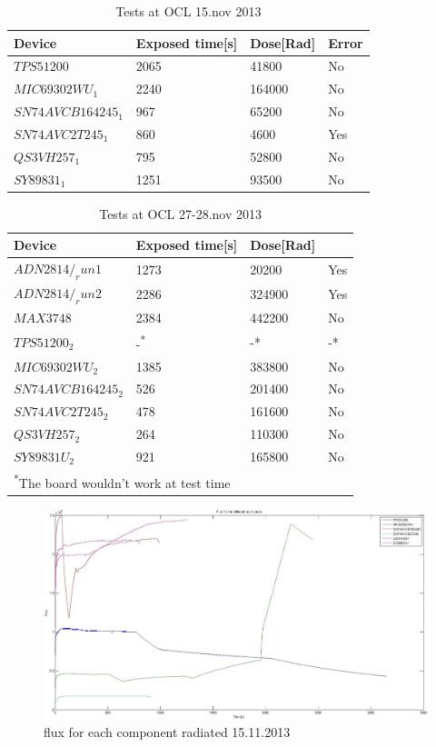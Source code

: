 \documentclass[12pt]{article}
\numberwithin{figure}{section}
\begin{document}
\begin{table}[!htbp]
 \centering
\begin{tabular}{|l|l|l|l|}\hline
Device & Exposed time[s] & Dose[Rad] & Error \\ \hline \hline
$TPS51200$ & 2065 & 41800 & No \\ \hline
$MIC69302WU_1$ & 2240 & 164000 & No \\ \hline
$SN74AVCB164245_1$ & 967  & 65200 & No \\ \hline
$SN74AVC2T245_1$ & 860  & 4600 & Yes \\ \hline
$QS3VH257_1$ & 795  & 52800 & No \\ \hline
$SY89831_1$ & 1251 & 93500 & No \\ \hline
\end{tabular}
\caption{Tests at OCL 15.nov 2013}
\label{dose_15.11}
\end{table}

\begin{table}[!htbp]
 \centering
\begin{tabular}{|l|l|l|l|}\hline
Device & Exposed time[s] & Dose[Rad] &  \\ \hline \hline
$ADN2814/_run1$ & 1273 & 20200 & Yes \\ \hline
$ADN2814/_run2$ & 2286 & 324900 & Yes \\ \hline
$MAX3748$ & 2384 & 442200 & No \\ \hline
$TPS51200_2$ & -\textsuperscript{*} & -* & -* \\ \hline
$MIC69302WU_2$ & 1385 & 383800 & No \\ \hline
$SN74AVCB164245_2$ & 526  & 201400 & No \\ \hline
$SN74AVC2T245_2$ & 478  & 161600 & No \\ \hline
$QS3VH257_2$ & 264  & 110300 & No \\ \hline
$SY89831U_2$ & 921  & 165800 & No \\ \hline
\multicolumn{4}{l}{\textsuperscript{*}\footnotesize{The board wouldn't work at test time}}
\end{tabular}
\caption{Tests at OCL 27-28.nov 2013}
\label{dose_28.11}
\end{table}

\begin{figure}[!htbp]
  \centering
  \includegraphics[width=\textwidth]{flux_all_test1.jpg}
  \caption{flux for each component radiated 15.11.2013}
  \label{flux_all1}
\end{figure}
\end{document}
